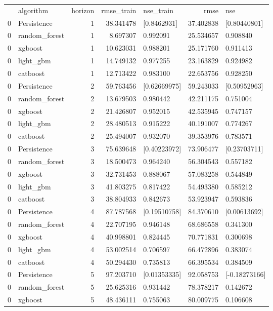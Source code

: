 \begin{tabular}{llrrlrl}
 & algorithm & horizon & rmse_train & nse_train & rmse & nse \\
0 & Persistence & 1 & 38.341478 & [0.8462931] & 37.402838 & [0.80440801] \\
0 & random_forest & 1 & 8.697307 & 0.992091 & 25.534657 & 0.908840 \\
0 & xgboost & 1 & 10.623031 & 0.988201 & 25.171760 & 0.911413 \\
0 & light_gbm & 1 & 14.749132 & 0.977255 & 23.163829 & 0.924982 \\
0 & catboost & 1 & 12.713422 & 0.983100 & 22.653756 & 0.928250 \\
0 & Persistence & 2 & 59.763456 & [0.62669975] & 59.243033 & [0.50952963] \\
0 & random_forest & 2 & 13.679503 & 0.980442 & 42.211175 & 0.751004 \\
0 & xgboost & 2 & 21.426807 & 0.952015 & 42.535945 & 0.747157 \\
0 & light_gbm & 2 & 28.480513 & 0.915222 & 40.191007 & 0.774267 \\
0 & catboost & 2 & 25.494007 & 0.932070 & 39.353976 & 0.783571 \\
0 & Persistence & 3 & 75.639648 & [0.40223972] & 73.906477 & [0.23703711] \\
0 & random_forest & 3 & 18.500473 & 0.964240 & 56.304543 & 0.557182 \\
0 & xgboost & 3 & 32.731453 & 0.888067 & 57.083258 & 0.544849 \\
0 & light_gbm & 3 & 41.803275 & 0.817422 & 54.493380 & 0.585212 \\
0 & catboost & 3 & 38.804933 & 0.842673 & 53.923947 & 0.593836 \\
0 & Persistence & 4 & 87.787568 & [0.19510758] & 84.370610 & [0.00613692] \\
0 & random_forest & 4 & 22.707195 & 0.946148 & 68.686558 & 0.341300 \\
0 & xgboost & 4 & 40.998801 & 0.824445 & 70.771831 & 0.300698 \\
0 & light_gbm & 4 & 53.002514 & 0.706597 & 66.472896 & 0.383074 \\
0 & catboost & 4 & 50.294430 & 0.735813 & 66.395534 & 0.384509 \\
0 & Persistence & 5 & 97.203710 & [0.01353335] & 92.058753 & [-0.18273166] \\
0 & random_forest & 5 & 25.625316 & 0.931442 & 78.378217 & 0.142672 \\
0 & xgboost & 5 & 48.436111 & 0.755063 & 80.009775 & 0.106608 \\

\end{tabular}
